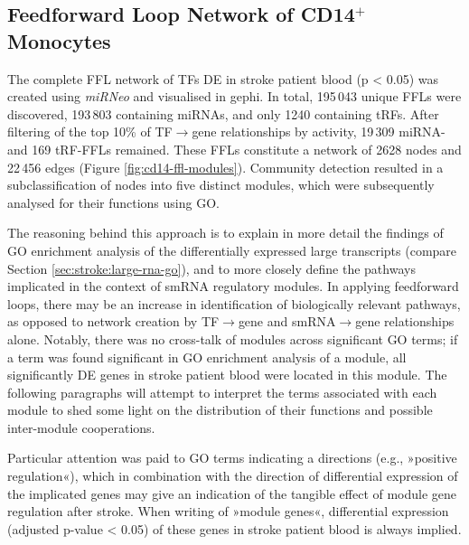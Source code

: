 \subsection{Feedforward Loop Network of CD14$^+$ Monocytes}
The complete FFL network of TFs DE in stroke patient blood (p < 0.05) was created using \emph{miRNeo} and visualised in gephi. In total, 195\,043 unique FFLs were discovered, 193\,803 containing miRNAs, and only 1240 containing tRFs. After filtering of the top 10\% of TF$\to$gene relationships by activity, 19\,309 miRNA- and 169 tRF-FFLs remained. These FFLs constitute a network of 2628 nodes and 22\,456 edges (Figure \ref{fig:cd14-ffl-modules}). Community detection\cite{Blondel2008} resulted in a subclassification of nodes into five distinct modules, which were subsequently analysed for their functions using GO.

The reasoning behind this approach is to explain in more detail the findings of GO enrichment analysis of the differentially expressed large transcripts (compare Section \ref{sec:stroke:large-rna-go}), and to more closely define the pathways implicated in the context of smRNA regulatory modules. In applying feedforward loops, there may be an increase in identification of biologically relevant pathways, as opposed to network creation by TF$\to$gene and smRNA$\to$gene relationships alone. Notably, there was no cross-talk of modules across significant GO terms; if a term was found significant in GO enrichment analysis of a module, all significantly DE genes in stroke patient blood were located in this module. The following paragraphs will attempt to interpret the terms associated with each module to shed some light on the distribution of their functions and possible inter-module cooperations.

Particular attention was paid to GO terms indicating a directions (e.g., »positive regulation«), which in combination with the direction of differential expression of the implicated genes may give an indication of the tangible effect of module gene regulation after stroke. When writing of »module genes«, differential expression (adjusted p-value < 0.05) of these genes in stroke patient blood is always implied.

